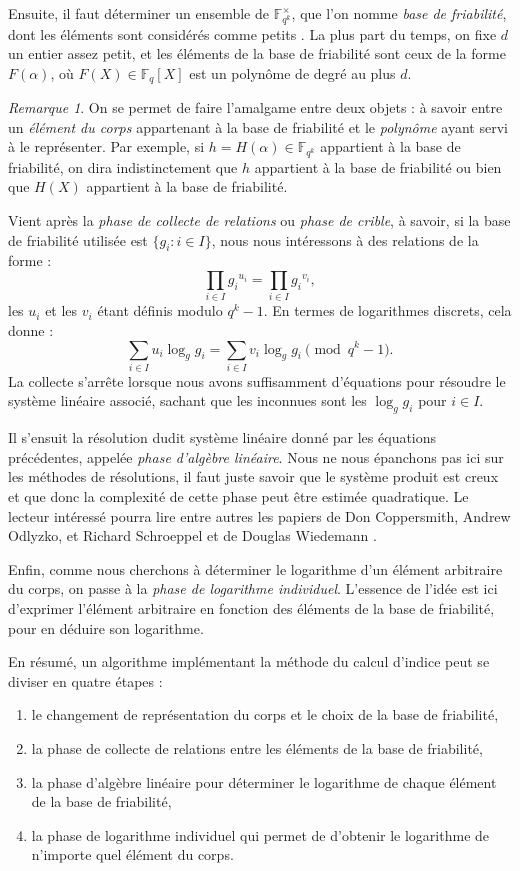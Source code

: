 \documentclass[a4paper, titlepage, 11pt]{article}
\theoremstyle{definition}
\theoremstyle{remark}
\newtheorem{rema}[theo]{Remarque}
\def\gf #1{\mathbb{F}_{#1}}
\begin{document}
Ensuite, il faut déterminer un ensemble de $\gf{q^k}^\times$, que l'on nomme \textit{base de friabilité}, dont les éléments sont considérés comme \og{}petits \fg{}. La plus part du temps, on fixe $d$ un entier assez petit, et les éléments de la base de friabilité sont ceux de la forme $F(\alpha)$, où $F(X)\in\gf{q}[X]$ est un polynôme de degré au plus $d$.

\begin{rema}
On se permet de faire l'amalgame entre deux objets : à savoir entre un \textit{élément du corps} appartenant à la base de friabilité et le \textit{polynôme} ayant servi à le représenter. Par exemple, si $h = H(\alpha)\in\gf{q^k}$ appartient à la base de friabilité, on dira indistinctement que $h$  appartient à la base de friabilité ou bien que $H(X)$ appartient à la base de friabilité.
\end{rema}

Vient après la \textit{phase de collecte de relations} ou \textit{phase de crible}, à savoir, si la base de friabilité utilisée est $\{g_i : i \in I\}$, nous nous intéressons à des relations de la forme :
$$\prod_{i\in I} {g_i}^{u_i} = \prod_{i\in I} {g_i}^{v_i},$$
les $u_i$ et les $v_i$ étant définis modulo $q^k-1$. En termes de logarithmes discrets, cela donne :
$$\sum_{i\in I} u_i \log_gg_i = \sum_{i\in I} v_i \log_gg_i \pmod{q^k-1}.$$
La collecte s’arrête lorsque nous avons suffisamment d'équations pour résoudre le système linéaire associé, sachant que les inconnues sont les $\log_gg_i$ pour  $i\in I$.

Il s'ensuit la résolution dudit système linéaire donné par les équations précédentes, appelée \textit{phase d'algèbre linéaire}. Nous ne nous épanchons pas ici sur les méthodes de résolutions, il faut juste savoir que le système produit est creux et que donc la complexité de cette phase peut être estimée quadratique. Le lecteur intéressé pourra lire entre autres les papiers de Don Coppersmith, Andrew Odlyzko, et Richard Schroeppel \cite{coppersmith1986} et de Douglas Wiedemann \cite{wiedemann1986}.

Enfin, comme nous cherchons à déterminer le logarithme d'un élément arbitraire du corps, on passe à la \textit{phase de logarithme individuel}. L'essence de l'idée est ici d'exprimer l'élément arbitraire en fonction des éléments de la base de friabilité, pour en déduire son logarithme.

En résumé, un algorithme implémentant la méthode du calcul d'indice peut se diviser en quatre étapes : \begin{enumerate}
\item le changement de représentation du corps et le choix de la base de friabilité,
\item la phase de collecte de relations entre les éléments de la base de friabilité,
\item la phase d'algèbre linéaire pour déterminer le logarithme de chaque élément de la base de friabilité,
\item la phase de logarithme individuel qui permet de d'obtenir le logarithme de n’importe quel élément du corps.
\end{enumerate}
\end{document}
